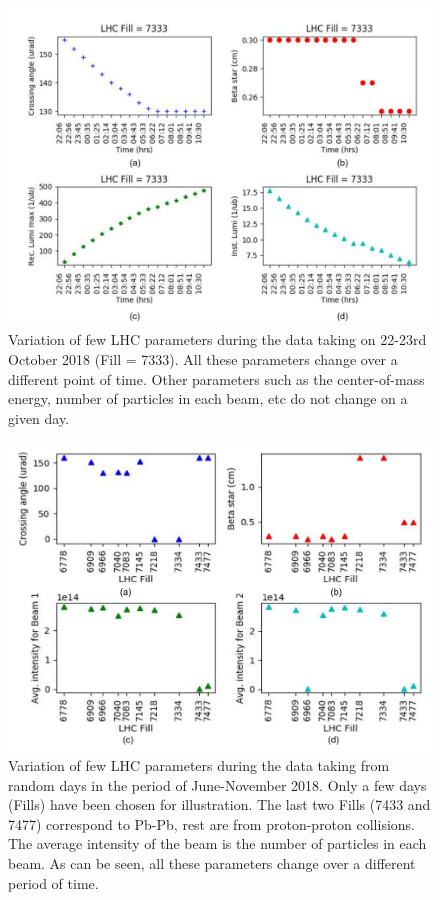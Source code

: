 \begin{figure}
  \begin{center}
  \includegraphics[width=0.70\linewidth]{Experiment/LHC/Image/lhc_param_day.pdf}
  \caption{Variation of few LHC parameters during the data taking on 22-23rd October
	  2018 (Fill = 7333). All these parameters change over a different point of time.
	  Other parameters such as the center-of-mass energy, number of particles in 
	  each beam, etc do not change on a given day.
	  }
  \label{fig:lhc_param_day}
  \end{center}
\end{figure}
\begin{figure}
  \begin{center}
  \includegraphics[width=0.70\linewidth]{Experiment/LHC/Image/lhc_param_month.pdf}
  \caption{Variation of few LHC parameters during the data taking from random days in
	  the period of June-November 2018. Only a few days (Fills) have been chosen for
	  illustration. The last two Fills (7433 and 7477) correspond to Pb-Pb, 
	  rest are from proton-proton collisions. The average intensity of the beam is the 
	  number of particles in each beam. As can be seen, all these parameters change over 
	  a different period of time.
	  }
  \label{fig:lhc_param_month}
  \end{center}
\end{figure}
